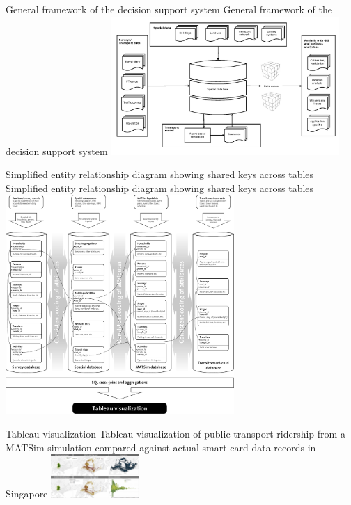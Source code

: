 \createfigure%
{General framework of the decision support system}%
{General framework of the decision support system}%
{\label{fig:analyticsFramework}}%
{\includegraphics[width=0.65\textwidth, angle=0]{extending/figures/businessanalytics/general}}%
{}

\createfigure%
{Simplified entity relationship diagram showing shared keys across tables}%
{Simplified entity relationship diagram showing shared keys across tables}%
{\label{fig:analyticsERD}}%
{\includegraphics[width=0.65\textwidth, angle=0]{extending/figures/businessanalytics/schema}}%
{}

\createfigure%
{Tableau visualization}%
{Tableau visualization of public transport ridership from a MATSim simulation compared against actual smart card data records in Singapore}%
{\label{fig:analyticsTableau}}%
{\includegraphics[width=0.25\textwidth, angle=0]{extending/figures/businessanalytics/tableau.png}}%
{}

